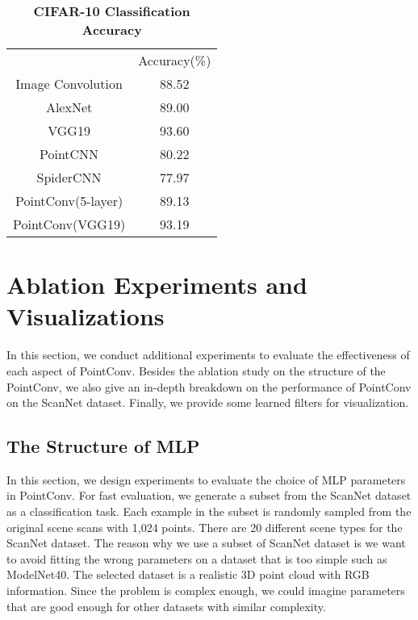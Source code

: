 \documentclass[10pt,twocolumn,letterpaper]{article}
\begin{document}
\setlength{\tabcolsep}{4pt}
\begin{table}
	\begin{center}
		\caption{\textbf{CIFAR-10 Classification Accuracy}}
		\label{table:alexnet}
		\begin{tabular}{c|c}
			\hline\noalign{\smallskip}
			    & Accuracy(\%)\\
			\noalign{\smallskip}
			\hline
			\noalign{\smallskip}
			Image Convolution & 88.52 \\
            AlexNet \cite{krizhevsky2012imagenet} & 89.00\\
            VGG19 \cite{simonyan2014very} & 93.60 \\
            PointCNN \cite{li2018pointcnn} & 80.22 \\
            SpiderCNN \cite{xu2018spidercnn} & 77.97 \\
            \noalign{\smallskip}
			\hline
			\noalign{\smallskip}
            PointConv(5-layer) & 89.13 \\
            PointConv(VGG19) & 93.19 \\
			\hline
		\end{tabular}
	\end{center}
\vspace{-0.3in}
\end{table}
\setlength{\tabcolsep}{1.4pt}


\section{Ablation Experiments and Visualizations}

In this section, we conduct additional experiments to evaluate the effectiveness of each aspect of PointConv. Besides the ablation study on the structure of the PointConv, we also give an in-depth breakdown on the performance of PointConv on the ScanNet dataset. Finally, we  provide some learned filters for visualization.

\subsection{The Structure of MLP}

In this section, we design experiments to evaluate the choice of MLP parameters in PointConv. For fast evaluation, we generate a subset from the ScanNet dataset as a classification task. Each example in the subset is randomly sampled from the original scene scans with 1,024 points. There are 20 different scene types for the ScanNet dataset. The reason why we use a subset of ScanNet dataset is we want to avoid fitting the wrong parameters on a dataset that is too simple such as ModelNet40. The selected dataset is a realistic 3D point cloud with RGB information. Since the problem is complex enough, we could imagine parameters that are good enough for other datasets with similar complexity.
\end{document}
